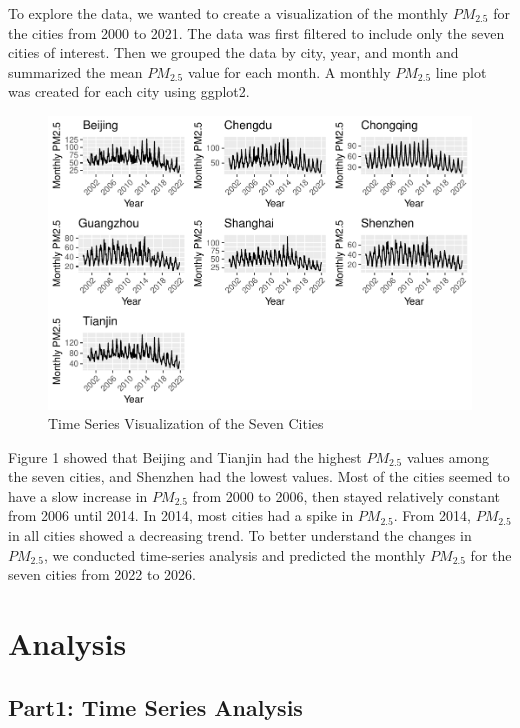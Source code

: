 \documentclass[
  12pt,
]{article}
\begin{document}
To explore the data, we wanted to create a visualization of the monthly
\(PM_{2.5}\) for the cities from 2000 to 2021. The data was first
filtered to include only the seven cities of interest. Then we grouped
the data by city, year, and month and summarized the mean \(PM_{2.5}\)
value for each month. A monthly \(PM_{2.5}\) line plot was created for
each city using ggplot2.

\begin{figure}
\centering
\includegraphics{LiFangRenZhang_ENV872_Project_files/figure-latex/TSA Visualization-1.pdf}
\caption{Time Series Visualization of the Seven Cities}
\end{figure}

Figure 1 showed that Beijing and Tianjin had the highest \(PM_{2.5}\)
values among the seven cities, and Shenzhen had the lowest values. Most
of the cities seemed to have a slow increase in \(PM_{2.5}\) from 2000
to 2006, then stayed relatively constant from 2006 until 2014. In 2014,
most cities had a spike in \(PM_{2.5}\). From 2014, \(PM_{2.5}\) in all
cities showed a decreasing trend. To better understand the changes in
\(PM_{2.5}\), we conducted time-series analysis and predicted the
monthly \(PM_{2.5}\) for the seven cities from 2022 to 2026.

\newpage

\hypertarget{analysis}{%
\section{Analysis}\label{analysis}}

\hypertarget{part1-time-series-analysis}{%
\subsection{Part1: Time Series
Analysis}\label{part1-time-series-analysis}}
\end{document}
